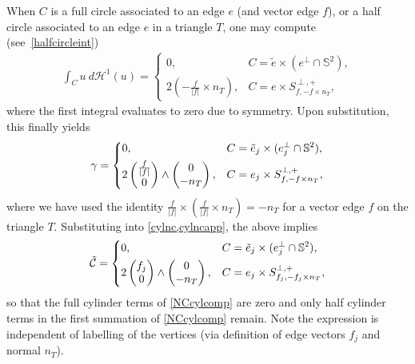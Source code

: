 \documentclass[sn-mathphys-num]{sn-jnl}%
\theoremstyle{thmstyleone}%
\theoremstyle{thmstyletwo}%
\theoremstyle{thmstylethree}%
\numberwithin{remark}{section}
\numberwithin{definition}{section}
\numberwithin{equation}{section}
\numberwithin{theorem}{section}
\begin{document}
When $C$ is a full circle associated to an edge $e$ (and vector edge $f$), or a half circle associated to an edge $e$ in a triangle $T$, one may compute (see~\cref{halfcircleint})
\begin{align*}
   \int_{C}{ u 
 \ d\mathcal{H}^{1}(u)}  = \begin{cases}
    0, 
    & C=\tilde{e} \times (e^{\perp} \cap \mathbb{S}^{2}),\\
			{2}(-\frac{f }{\lvert f\rvert}\times n_{T}), 
      & C=e \times S_{f,-f\times n_{T}}^{\perp,+},
		 \end{cases}
\end{align*}%
where the first integral evaluates to zero due to symmetry. Upon substitution, this finally yields
\begin{gather*}
    \gamma = \begin{dcases}
      0, & C=\tilde{e}_j \times (e_j^{\perp} \cap \mathbb{S}^{2}),\\ {2}
			\begin{pmatrix}  \frac{f }{\lvert f \rvert} \\ 0  \end{pmatrix}\wedge  \begin{pmatrix} 0\\  -n_{T } \end{pmatrix} , & C=e_j \times S_{f,-f\times n_{T}}^{\perp,+},
		 \end{dcases}
\end{gather*}
where we have used the identity $\frac{f }{\lvert f \rvert} \times (\frac{f}{\lvert f\rvert}\times n_{T})=-n_{T}$ for a vector edge $f$ on the triangle $T$. Substituting into \cref{cylnc,cylncapp}, the above  implies 
\begin{gather*}
 \tilde{\mathcal{C}}=  
\begin{dcases}
    0, & C=\tilde{e}_j \times (e_j^{\perp} \cap \mathbb{S}^{2}),\\ 2
			\begin{pmatrix}  f_j  \\ 0  \end{pmatrix}\wedge  \begin{pmatrix} 0\\  -n_{T } \end{pmatrix} , & C=e_j \times S_{f_j,-f_j\times n_{T}}^{\perp,+},
		 \end{dcases} 
\end{gather*}
so that the full cylinder terms of \cref{NCcylcomp} are zero and only half cylinder terms in the first summation of \cref{NCcylcomp} remain. Note the expression is independent of labelling of the vertices (via definition of  edge vectors $f_j$ and normal $n_T$).
\end{document}
